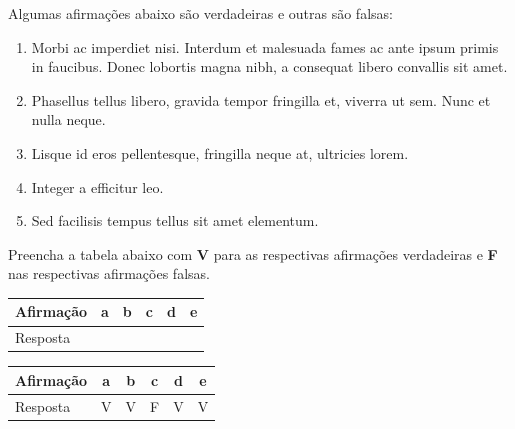 \documentclass[12pt,a4paper]{article}
\begin{document}
\begin{question}
    Algumas afirmações abaixo são verdadeiras e outras são falsas:
    \begin{enumerate}
        \item Morbi ac imperdiet nisi. Interdum et malesuada fames ac ante ipsum primis in faucibus. Donec lobortis magna nibh, a consequat libero convallis sit amet.
        \item Phasellus tellus libero, gravida tempor fringilla et, viverra ut sem. Nunc et nulla neque. 
        \item Lisque id eros pellentesque, fringilla neque at, ultricies lorem.
        \item Integer a efficitur leo. 
        \item Sed facilisis tempus tellus sit amet elementum. 
    \end{enumerate}
    Preencha a tabela abaixo com \textbf{V} para as respectivas  afirmações verdadeiras e \textbf{F} nas respectivas afirmações falsas.
    \begin{table}[h]
        \centering
        \begin{tabular}{l|c|c|c|c|c|}
            \toprule
            Afirmação & a & b & c & d & e \\
            \midrule
            Resposta &  &  &  &  &  \\
            \bottomrule
        \end{tabular}
    \end{table}
\end{question}
\begin{answer}[print=true]
    \begin{table}[h]
        \centering
        \begin{tabular}{l|c|c|c|c|c|}
            \toprule
            Afirmação & a & b & c & d & e \\
            \midrule
            Resposta & V & V & F & V & V \\
            \bottomrule
        \end{tabular}
    \end{table}
\end{answer}

\centering
\vfill
\gradingtable[template=default*,type=question]
\end{document}
